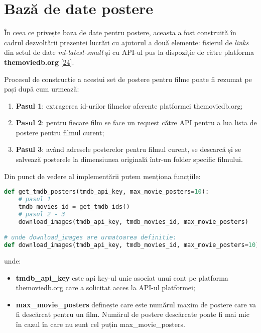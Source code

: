 \section{Bază de date postere}
În ceea ce privește baza de date pentru postere, aceasta a fost construită în cadrul dezvoltării prezentei lucrări cu ajutorul a două elemente: fișierul de \textit{links} din setul de date \textit{ml-latest-small} și cu API-ul pus la dispoziție de către platforma \textbf{themoviedb.org} \hyperlink{themoviedb}{[24]}.

Procesul de construcție a acestui set de postere pentru filme poate fi rezumat pe pași după cum urmează:
\begin{enumerate}
	\item \textbf{Pasul 1}: extragerea id-urilor filmelor aferente platformei themoviedb.org;
	\item \textbf{Pasul 2}: pentru fiecare film se face un request către API pentru a lua lista de postere pentru filmul curent;
	\item \textbf{Pasul 3}: având adresele posterelor pentru filmul curent, se descarcă și se salvează posterele la dimensiunea originală într-un folder specific filmului.
\end{enumerate}
Din punct de vedere al implementării putem menționa funcțiile:
\begin{lstlisting}[language=Python, caption=Construcția setul de date cu postere]
def get_tmdb_posters(tmdb_api_key, max_movie_posters=10):
    # pasul 1    
    tmdb_movies_id = get_tmdb_ids()
    # pasul 2 - 3
    download_images(tmdb_api_key, tmdb_movies_id, max_movie_posters)

# unde download_images are urmatoarea definitie:
def download_images(tmdb_api_key, tmdb_movies_id, max_movie_posters=10):
\end{lstlisting}
unde:
\begin{itemize}
	\item \textbf{tmdb\_api\_key} este api key-ul unic asociat unui cont pe platforma themoviedb.org care a solicitat acces la API-ul platformei;
	\item \textbf{max\_movie\_posters} definește care este numărul maxim de postere care va fi descărcat pentru un film. Numărul de postere descărcate poate fi mai mic în cazul în care nu sunt cel puțin max\_movie\_posters.
\end{itemize}

